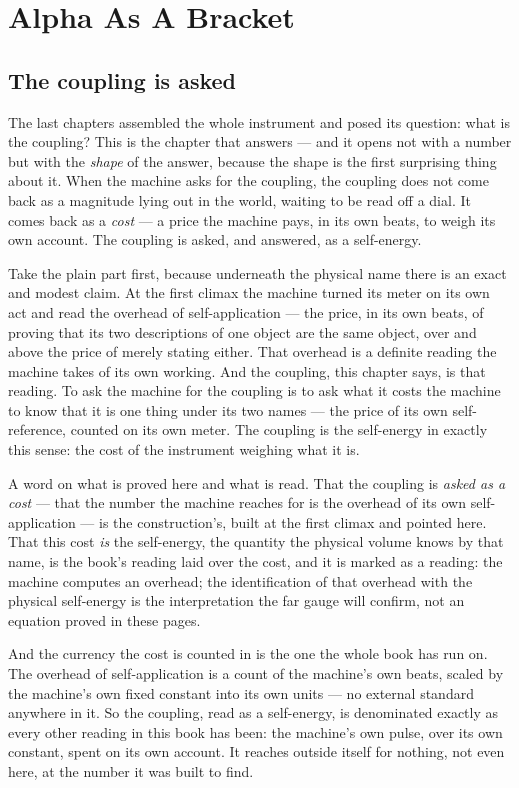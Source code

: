 \chapter{Alpha As A Bracket}

\section{The coupling is asked}

The last chapters assembled the whole instrument and posed its question: what is the coupling? This is the chapter that
answers --- and it opens not with a number but with the \emph{shape} of the answer, because the shape is the first
surprising thing about it. When the machine asks for the coupling, the coupling does not come back as a magnitude lying
out in the world, waiting to be read off a dial. It comes back as a \emph{cost} --- a price the machine pays, in its
own beats, to weigh its own account. The coupling is asked, and answered, as a self-energy.

Take the plain part first, because underneath the physical name there is an exact and modest claim. At the first climax
the machine turned its meter on its own act and read the overhead of self-application --- the price, in its own beats,
of proving that its two descriptions of one object are the same object, over and above the price of merely stating
either. That overhead is a definite reading the machine takes of its own working. And the coupling, this chapter says,
is that reading. To ask the machine for the coupling is to ask what it costs the machine to know that it is one thing
under its two names --- the price of its own self-reference, counted on its own meter. The coupling is the self-energy
in exactly this sense: the cost of the instrument weighing what it is.

A word on what is proved here and what is read. That the coupling is \emph{asked as a cost} --- that the number the
machine reaches for is the overhead of its own self-application --- is the construction's, built at the first climax
and pointed here. That this cost \emph{is} the self-energy, the quantity the physical volume knows by that name, is the
book's reading laid over the cost, and it is marked as a reading: the machine computes an overhead; the identification
of that overhead with the physical self-energy is the interpretation the far gauge will confirm, not an equation proved
in these pages.

And the currency the cost is counted in is the one the whole book has run on. The overhead of self-application is a
count of the machine's own beats, scaled by the machine's own fixed constant into its own units --- no external
standard anywhere in it. So the coupling, read as a self-energy, is denominated exactly as every other reading in this
book has been: the machine's own pulse, over its own constant, spent on its own account. It reaches outside itself for
nothing, not even here, at the number it was built to find.

